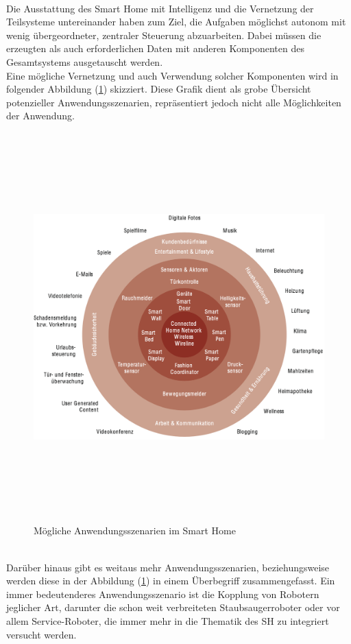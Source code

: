         \\
        \linebreak
        Die Ausstattung des Smart Home mit Intelligenz und die Vernetzung der Teilsysteme untereinander haben zum Ziel, die Aufgaben möglichst 
        autonom mit wenig übergeordneter, zentraler Steuerung abzuarbeiten. 
        Dabei müssen die erzeugten als auch erforderlichen Daten mit anderen 
        Komponenten des Gesamtsystems ausgetauscht werden. 
        \\
        Eine mögliche Vernetzung und auch Verwendung solcher Komponenten wird in folgender Abbildung (\ref{pic:szenarien-smarhome}) 
        skizziert. Diese Grafik dient als grobe Übersicht potenzieller Anwendungsszenarien, repräsentiert jedoch nicht alle Möglichkeiten der Anwendung. %
        \begin{figure}[hbt!]
            \centering
            \includegraphics[width=15cm,height=15cm,keepaspectratio]{images/Anwendungsszenarien_SH.png}
            \caption{Mögliche Anwendungsszenarien im Smart Home \cite{strese.2010m}}
            \label{pic:szenarien-smarhome}
        \end{figure}
        \\
        Darüber hinaus gibt es weitaus mehr Anwendungsszenarien, beziehungsweise werden diese in der Abbildung 
        (\ref{pic:szenarien-smarhome}) in einem Überbegriff zusammengefasst.
        Ein immer bedeutenderes Anwendungsszenario ist die Kopplung 
        von Robotern jeglicher Art, darunter die schon weit verbreiteten Staubsaugerroboter oder 
        vor allem Service-Roboter, die immer mehr in die Thematik des \acl{SH}  zu integriert versucht werden. 
        
